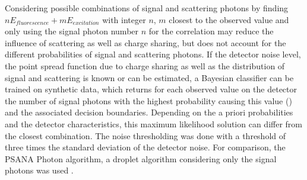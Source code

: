 Considering possible combinations of signal and scattering photons by finding  $nE_{fluorescence}+mE_{excitation}$ with integer $n$, $m$ closest to the observed value and only using the signal photon number $n$ for the correlation may reduce the influence of scattering as well as charge sharing, but does not account for the different probabilities of signal and scattering photons. If the detector noise level, the point spread function due to charge sharing as well as the distribution of signal and scattering is known or can be estimated, a Bayesian classifier can be trained on synthetic data, which returns for each observed value on the detector the number of signal photons with the highest probability causing this value () and the associated decision boundaries. Depending on the a priori probabilities and the detector characteristics, this maximum likelihood solution can differ from the closest combination. The noise thresholding was done with a threshold of three times the standard deviation of the detector noise. For comparison, the PSANA Photon algorithm, a droplet algorithm considering only the signal photons was used \cite{psana}.

